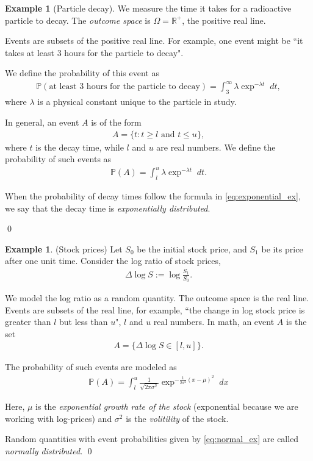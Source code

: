 \documentclass[11pt]{article}
\theoremstyle{definition}
\newtheorem{example}[theorem]{Example}
\renewcommand{\P}{\mathbb{P}}
\newcommand{\R}{\mathbb{R}}
\begin{document}
\begin{example}[Particle decay]
  We measure the time it takes for a radioactive particle to decay.
  The \textit{outcome space} is $\Omega = \R^{+}$, the positive real line.

  Events are subsets of the positive real line. For example, one
  event might be ``it takes at least 3 hours for the particle to decay".

  We define the probability of this event as
  \begin{align*}
    \P(\text{at least 3 hours for the particle to decay}) =
    \int_{3}^\infty \lambda \exp^{-\lambda t} \;dt,
  \end{align*}
  where $\lambda$ is a physical constant unique to the particle in study.

  In general, an event $A$ is of the form
  \begin{align*}
    A = \{t : t \geq l \text{ and } t \leq u\},
  \end{align*}
  where $t$ is the decay time, while $l$ and $u$ are real numbers.
  We define the probability of such events as
  \begin{align}
    \P(A) =
    \int_{l}^u \lambda \exp^{-\lambda t} \;dt.
    \label{eq:exponential_ex}
  \end{align}

  When the probability of decay times follow the formula in \eqref{eq:exponential_ex},
  we say that the decay time is \textit{exponentially distributed}.

\qed
\end{example}

\begin{example}(Stock prices)
  Let $S_0$ be the initial stock price, and $S_1$ be its price after one unit time.
  Consider the log ratio of stock prices,
  \begin{align*}
    \Delta \log S := \log\frac{S_1}{S_0}.
  \end{align*}

  We model the log ratio as a random quantity.
  The outcome space is the real line. Events are subsets of the real line,
  for example, ``the change in log stock price is greater than $l$ but less than $u$",
  $l$ and $u$ real numbers. In math, an event $A$ is the set
  \begin{align*}
    A = \{\Delta \log S \in [l, u]\}.
  \end{align*}

  The probability of such events are modeled as
  \begin{align}
    \P(A) = \int_{l}^u \frac{1}{\sqrt{2\pi\sigma^2}}
    \exp^{-\frac{1}{2\sigma^2}(x - \mu)^2} \; dx
    \label{eq:normal_ex}
  \end{align}

  Here, $\mu$ is the \textit{exponential growth rate of the stock} (exponential because
  we are working with log-prices) and $\sigma^2$ is the \textit{volitility} of the stock.

  Random quantities with event probabilities
  given by \eqref{eq:normal_ex} are called \textit{normally distributed}.
\qed
\end{example}
\end{document}
